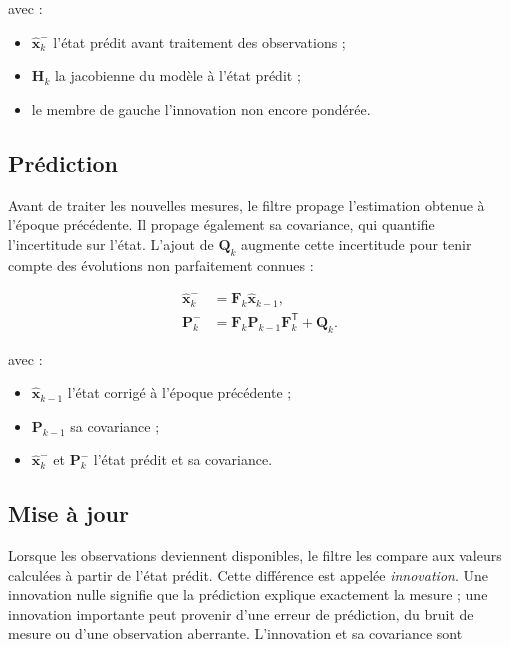 avec :

\begin{itemize}
    \item $\widehat{\mathbf x}_k^-$ l'état prédit avant traitement des
    observations ;
    \item $\mathbf H_k$ la jacobienne du modèle à l'état prédit ;
    \item le membre de gauche l'innovation non encore pondérée.
\end{itemize}

\subsection{Prédiction}

Avant de traiter les nouvelles mesures, le filtre propage l'estimation obtenue
à l'époque précédente. Il propage également sa covariance, qui quantifie
l'incertitude sur l'état. L'ajout de $\mathbf Q_k$ augmente cette incertitude
pour tenir compte des évolutions non parfaitement connues :

\begin{align}
\widehat{\mathbf x}_k^-
&=
\mathbf F_k\widehat{\mathbf x}_{k-1},
\\
\mathbf P_k^-
&=
\mathbf F_k\mathbf P_{k-1}\mathbf F_k^{\mathsf T}
+\mathbf Q_k.
\label{ann:eq:ekf_predict}
\end{align}

avec :

\begin{itemize}
    \item $\widehat{\mathbf x}_{k-1}$ l'état corrigé à l'époque précédente ;
    \item $\mathbf P_{k-1}$ sa covariance ;
    \item $\widehat{\mathbf x}_k^-$ et $\mathbf P_k^-$ l'état prédit et sa
    covariance.
\end{itemize}

\subsection{Mise à jour}

Lorsque les observations deviennent disponibles, le filtre les compare aux
valeurs calculées à partir de l'état prédit. Cette différence est appelée
\emph{innovation}. Une innovation nulle signifie que la prédiction explique
exactement la mesure ; une innovation importante peut provenir d'une erreur de
prédiction, du bruit de mesure ou d'une observation aberrante. L'innovation et
sa covariance sont

